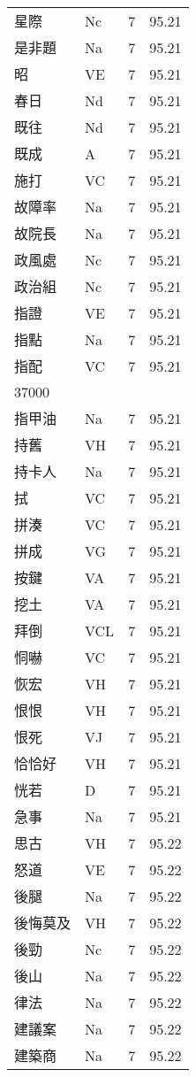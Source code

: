 \documentclass[twocolumn]{book}
\begin{document}
\begin{supertabular}{llrr}
星際 & Nc & 7 &  95.21\\
是非題 & Na & 7 &  95.21\\
昭 & VE & 7 &  95.21\\
春日 & Nd & 7 &  95.21\\
既往 & Nd & 7 &  95.21\\
既成 & A & 7 &  95.21\\
施打 & VC & 7 &  95.21\\
故障率 & Na & 7 &  95.21\\
故院長 & Na & 7 &  95.21\\
政風處 & Nc & 7 &  95.21\\
政治組 & Nc & 7 &  95.21\\
指證 & VE & 7 &  95.21\\
指點 & Na & 7 &  95.21\\
指配 & VC & 7 &  95.21\\
37000\\
指甲油 & Na & 7 &  95.21\\
持舊 & VH & 7 &  95.21\\
持卡人 & Na & 7 &  95.21\\
拭 & VC & 7 &  95.21\\
拼湊 & VC & 7 &  95.21\\
拼成 & VG & 7 &  95.21\\
按鍵 & VA & 7 &  95.21\\
挖土 & VA & 7 &  95.21\\
拜倒 & VCL & 7 &  95.21\\
恫嚇 & VC & 7 &  95.21\\
恢宏 & VH & 7 &  95.21\\
恨恨 & VH & 7 &  95.21\\
恨死 & VJ & 7 &  95.21\\
恰恰好 & VH & 7 &  95.21\\
恍若 & D & 7 &  95.21\\
急事 & Na & 7 &  95.21\\
思古 & VH & 7 &  95.22\\
怒道 & VE & 7 &  95.22\\
後腿 & Na & 7 &  95.22\\
後悔莫及 & VH & 7 &  95.22\\
後勁 & Nc & 7 &  95.22\\
後山 & Na & 7 &  95.22\\
律法 & Na & 7 &  95.22\\
建議案 & Na & 7 &  95.22\\
建築商 & Na & 7 &  95.22\\

\end{supertabular}
\end{document}
